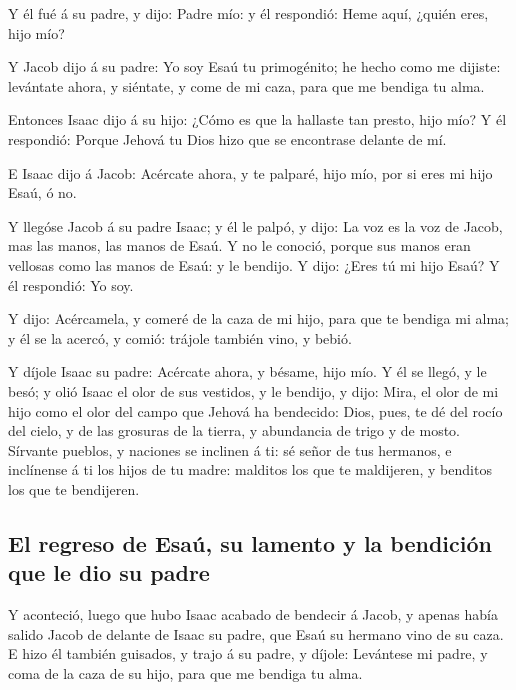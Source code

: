  Y él fué á su padre, y dijo: Padre mío: y él respondió:
Heme aquí, ¿quién eres, hijo mío?

 Y Jacob dijo á su padre: Yo soy Esaú tu primogénito; he
hecho como me dijiste: levántate ahora, y siéntate, y come de mi caza,
para que me bendiga tu alma.

 Entonces Isaac dijo á su hijo: ¿Cómo es que la hallaste
tan presto, hijo mío? Y él respondió: Porque Jehová tu Dios hizo que se
encontrase delante de mí.

 E Isaac dijo á Jacob: Acércate ahora, y te palparé, hijo
mío, por si eres mi hijo Esaú, ó no.

 Y llegóse Jacob á su padre Isaac; y él le palpó, y dijo:
La voz es la voz de Jacob, mas las manos, las manos de Esaú.
 Y no le conoció, porque sus manos eran vellosas como las
manos de Esaú: y le bendijo.  Y dijo: ¿Eres tú mi hijo
Esaú? Y él respondió: Yo soy.

 Y dijo: Acércamela, y comeré de la caza de mi hijo, para
que te bendiga mi alma; y él se la acercó, y comió: trájole también
vino, y bebió.

 Y díjole Isaac su padre: Acércate ahora, y bésame, hijo
mío.  Y él se llegó, y le besó; y olió Isaac el olor de
sus vestidos, y le bendijo, y dijo: Mira, el olor de mi hijo como el
olor del campo que Jehová ha bendecido:  Dios, pues, te
dé del rocío del cielo, y de las grosuras de la tierra, y abundancia de
trigo y de mosto.  Sírvante pueblos, y naciones se
inclinen á ti: sé señor de tus hermanos, e inclínense á ti los hijos de
tu madre: malditos los que te maldijeren, y benditos los que te
bendijeren.

\hypertarget{el-regreso-de-esauxfa-su-lamento-y-la-bendiciuxf3n-que-le-dio-su-padre}{%
\subsection{El regreso de Esaú, su lamento y la bendición que le dio su
padre}\label{el-regreso-de-esauxfa-su-lamento-y-la-bendiciuxf3n-que-le-dio-su-padre}}

 Y aconteció, luego que hubo Isaac acabado de bendecir á
Jacob, y apenas había salido Jacob de delante de Isaac su padre, que
Esaú su hermano vino de su caza.  E hizo él también
guisados, y trajo á su padre, y díjole: Levántese mi padre, y coma de la
caza de su hijo, para que me bendiga tu alma.

